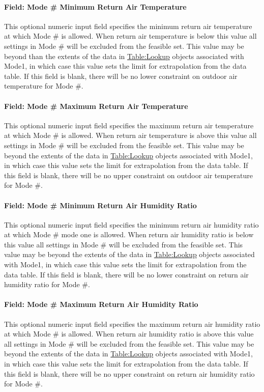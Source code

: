 \paragraph{Field: Mode \# Minimum Return Air Temperature}
This optional numeric input field specifies the minimum return air temperature at which Mode \# is allowed. When return air temperature is below this value all settings in Mode \# will be excluded from the feasible set. This value may be beyond than the extents of the  data in \hyperref[tablelookup]{Table:Lookup} objects associated with Mode1, in which case this value sets the limit for extrapolation from the data table. If this field is blank, there will be no lower constraint on outdoor air temperature for Mode \#.

\paragraph{Field: Mode \# Maximum Return Air Temperature}
This optional numeric input field specifies the maximum return air temperature at which Mode \# is allowed. When return air temperature is above this value all settings in Mode \# will be excluded from the feasible set. This value may be beyond the extents of the data in \hyperref[tablelookup]{Table:Lookup} objects associated with Mode1, in which case this value sets the limit for extrapolation from the data table. If this field is blank, there will be no upper constraint on outdoor air temperature for Mode \#.

\paragraph{Field: Mode \# Minimum Return Air Humidity Ratio}
This optional numeric input field specifies the minimum return air humidity ratio at which Mode \# mode one is allowed. When return air humidity ratio is below this value all settings in Mode \# will be excluded from the feasible set. This value may be beyond the extents of the data in \hyperref[tablelookup]{Table:Lookup} objects associated with Mode1, in which case this value sets the limit for extrapolation from the data table. If this field is blank, there will be no lower constraint on return air humidity ratio for Mode \#.

\paragraph{Field: Mode \# Maximum Return Air Humidity Ratio}
This optional numeric input field specifies the maximum return air humidity ratio at which Mode \# is allowed. When return air humidity ratio is above this value all settings in Mode \# will be excluded from the feasible set. This value may be beyond the extents of the data in \hyperref[tablelookup]{Table:Lookup} objects associated with Mode1, in which case this value sets the limit for extrapolation from the data table. If this field is blank, there will be no upper constraint on return air humidity ratio for Mode \#.

